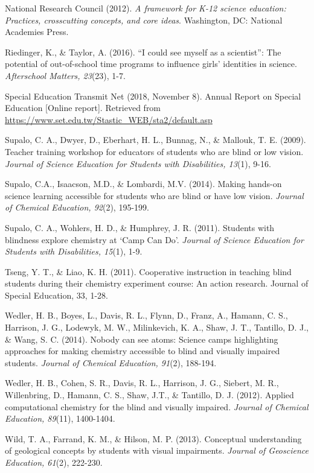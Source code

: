 \documentclass[11.5pt]{sig-alternate} %
\begin{document}
National Research Council (2012). \textit{A framework for K-12 science education: Practices, crosscutting concepts, and core ideas}. Washington, DC: National Academies Press.

Riedinger, K., \& Taylor, A. (2016). “I could see myself as a scientist”: The potential of out-of-school time programs to influence girls' identities in science. \textit{Afterschool Matters, 23}(23), 1-7.

Special Education Transmit Net (2018, November 8). Annual Report on Special Education [Online report]. Retrieved from \url{https://www.set.edu.tw/Stastic\_WEB/sta2/default.asp}

Supalo, C. A., Dwyer, D., Eberhart, H. L., Bunnag, N., \& Mallouk, T. E. (2009). Teacher training workshop for educators of students who are blind or low vision. \textit{Journal of Science Education for Students with Disabilities, 13}(1), 9-16.

Supalo, C.A., Isaacson, M.D., \& Lombardi, M.V. (2014). Making hands-on science learning accessible for students who are blind or have low vision. \textit{Journal of Chemical Education, 92}(2), 195-199.

Supalo, C. A., Wohlers, H. D., \& Humphrey, J. R. (2011). Students with blindness explore chemistry at ‘Camp Can Do’. \textit{Journal of Science Education for Students with Disabilities, 15}(1), 1-9.

Tseng, Y. T., \& Liao, K. H. (2011). Cooperative instruction in teaching blind students during their chemistry experiment course: An action research. Journal of Special Education, 33, 1-28.

Wedler, H. B., Boyes, L., Davis, R. L., Flynn, D., Franz, A., Hamann, C. S., Harrison, J. G., Lodewyk, M. W., Milinkevich, K. A., Shaw, J. T., Tantillo, D. J., \& Wang, S. C. (2014). Nobody can see atoms: Science camps highlighting approaches for making chemistry accessible to blind and visually impaired students. \textit{Journal of Chemical Education, 91}(2), 188-194.

Wedler, H. B., Cohen, S. R., Davis, R. L., Harrison, J. G., Siebert, M. R., Willenbring, D., Hamann, C. S., Shaw, J.T., \& Tantillo, D. J. (2012). Applied computational chemistry for the blind and visually impaired. \textit{Journal of Chemical Education, 89}(11), 1400-1404.

Wild, T. A., Farrand, K. M., \& Hilson, M. P. (2013). Conceptual understanding of geological concepts by students with visual impairments. \textit{Journal of Geoscience Education, 61}(2), 222-230.
\end{document}
